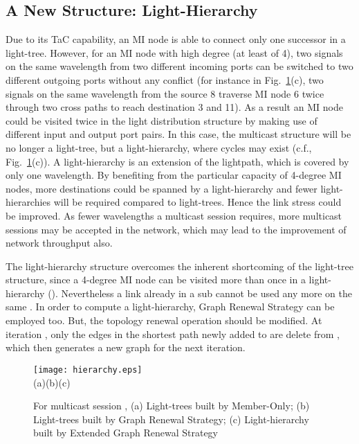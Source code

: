 \documentclass[conference]{IEEEtran}
\begin{document}
\subsection{A New Structure: Light-Hierarchy}
\label{subsec:Edge Disjoint Path Routing Algorithm}
Due to its TaC capability, an MI node is able to connect only one successor in a light-tree. However, for an MI node with high degree (at least of 4), two signals on the same wavelength from two different incoming ports can be switched to two different outgoing ports without any conflict (for instance in Fig.~\ref{fig: hierarchy}(c), two signals on the same wavelength  from the source 8 traverse MI node 6 twice through two cross paths to reach destination 3 and 11). As a result an MI node could be visited twice in the light distribution structure by making use of different input and output port pairs. In this case, the multicast structure will be no longer a light-tree, but a light-hierarchy, where cycles may exist (c.f., Fig.~\ref{fig: hierarchy}(c)). A light-hierarchy is an extension of the lightpath, which is covered by only one wavelength. By benefiting from the particular capacity of 4-degree MI nodes, more destinations could be spanned by a light-hierarchy and fewer light-hierarchies will be required compared to light-trees. Hence the link stress could be improved. As fewer wavelengths a multicast session requires, more multicast sessions may be accepted in the network, which may lead to the improvement of network throughput also.

The light-hierarchy structure overcomes the inherent shortcoming of the light-tree structure, since a 4-degree MI node can be visited more than once in a light-hierarchy (). Nevertheless a link already in a sub  cannot be used any more on the same . In order to compute a light-hierarchy, Graph Renewal Strategy can be employed too. But, the topology renewal operation should be modified. At iteration , only the edges in the shortest path newly added to  are delete from , which then generates a new graph  for the next iteration.

\begin{figure}
        \centering
        \texttt{[image: hierarchy.eps]}
        \\
        \mbox{(a)}\hspace{.9in}\mbox{(b)}\hspace{.9in}\mbox{(c)}
        \caption{For multicast session , (a) Light-trees built by Member-Only; (b) Light-trees built by Graph Renewal Strategy; (c) Light-hierarchy built by Extended Graph Renewal Strategy}
        \label{fig: hierarchy}
\end{figure}
\end{document}
